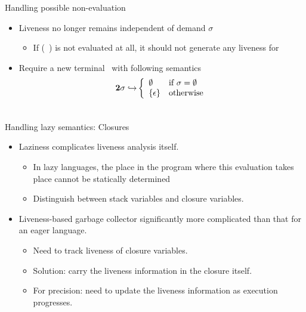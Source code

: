 \documentclass[xcolor=x11names,compress,mathserif]{beamer}
\renewcommand{\(}{\begin{columns}}
\renewcommand{\)}{\end{columns}}
\newcommand{\<}[1]{\begin{column}{#1}}
\renewcommand{\>}{\end{column}}
\begin{document}
\begin{frame} {Handling possible non-evaluation}
  \begin{itemize}
  \item Liveness no longer remains independent of demand $\sigma$ \\
    \begin{itemize}
    \item If (\CAR~\px) is not evaluated at all, it should not generate any liveness for \px
    \end{itemize}
  \item Require a new terminal \clazy\ with following semantics
    \begin{align*}
      {\mathbf{2}}\sigma \hookrightarrow & \left\{ 
      \begin{array}{ll}
        \emptyset&\mbox{if}~\sigma = \emptyset\\
        \{\epsilon\} & \mbox{otherwise}
      \end{array}\right.\\ & \\
    \end{align*}
  \end{itemize}
\end{frame}
\begin{frame}{Handling lazy semantics: Closures}
\normalsize
  \begin{itemize}\itemsep2em
  \item Laziness complicates liveness analysis itself. 
    \begin{itemize}
    \item In lazy languages, the place in the program
      where this evaluation takes place cannot be statically determined
    \item Distinguish between stack variables and closure variables.    
    \end{itemize}
    \pause
  \item Liveness-based garbage collector significantly more complicated than that for an eager language.
    \begin{itemize}
    \item Need to track liveness of closure variables.
    \item Solution: carry the liveness information in the closure itself.
    \item For precision: need to update the liveness information as execution progresses.
    \end{itemize}
  \end{itemize}
\end{frame}
\end{document}
